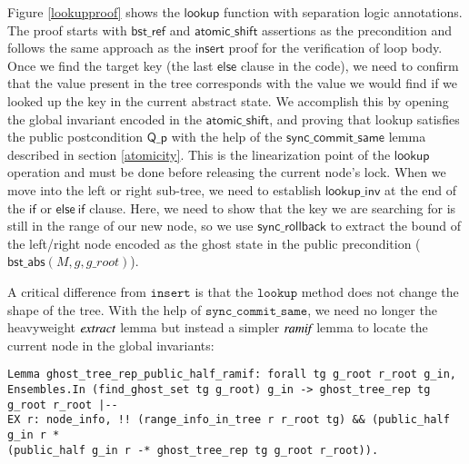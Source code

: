 \documentclass[runningheads]{llncs}
\newcommand{\treerep}{\ensuremath{\mathsf{bst\_abs}}}
\newcommand{\nodeboxrep}{\ensuremath{\mathsf{bst\_ref}}}
\begin{document}
{Figure \ref{lookupproof} shows the $\mathsf{lookup}$ function
with separation logic annotations. The proof starts with
$\nodeboxrep$ and $\mathsf{atomic\_shift}$ assertions as the
precondition and follows the same approach as the $\mathsf{insert}$
proof for the verification of loop body. Once we find the target key
(the last $\mathsf{else}$ clause in the code), we need
to confirm that the value present in the tree corresponds with the value we would find if we looked up the key in the current abstract state. We accomplish this by opening the global
invariant encoded in the $\mathsf{atomic\_shift}$, and proving that
lookup satisfies the public postcondition $\mathsf{Q\_p}$ with the help
of the $\mathsf{sync\_commit\_same}$ lemma described in section
\ref{atomicity}. This is the linearization point of the
$\mathsf{lookup}$ operation and must be done before releasing the
current node's lock. When we move into the left or right sub-tree,
we need to establish $\mathsf{lookup\_inv}$ at the end of the $\mathsf{if}$
or $\mathsf{else\ if}$ clause. Here, we need to show that the key we
are searching for is still in the range of our new node, so we use
$\mathsf{sync\_rollback}$ to extract the bound of the left/right
node encoded as the ghost state in the public precondition
($\treerep(M, g, g\_root)$).

A critical difference from $\texttt{insert}$ is that the
$\texttt{lookup}$ method does not change the shape of the tree. With the
help of $\texttt{sync\_commit\_same}$, we need no longer the
heavyweight $\emph{extract}$ lemma but instead a simpler
$\emph{ramif}$ lemma to locate the current node in the global
invariants:
\begin{verbatim}
Lemma ghost_tree_rep_public_half_ramif: forall tg g_root r_root g_in,
Ensembles.In (find_ghost_set tg g_root) g_in -> ghost_tree_rep tg g_root r_root |-- 
EX r: node_info, !! (range_info_in_tree r r_root tg) && (public_half g_in r * 
(public_half g_in r -* ghost_tree_rep tg g_root r_root)).
\end{verbatim}

}
\end{document}
